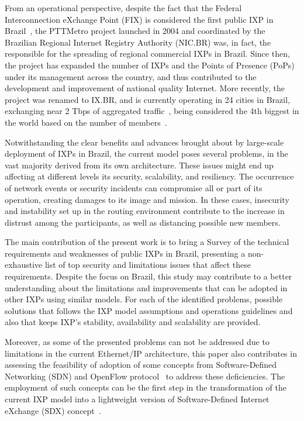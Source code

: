 \documentclass[12pt]{article}
\begin{document}
From an operational perspective, despite the fact that the Federal Interconnection eXchange Point (FIX) is considered the first public IXP in Brazil~\cite{fix2002}, the PTTMetro project launched in 2004 and coordinated by the Brazilian Regional Internet Registry Authority (NIC.BR) was, in fact, the responsible for the spreading of regional commercial IXPs in Brazil. Since then, the project has expanded the number of IXPs and the Points of Presence (PoPs) under its management across the country, and thus contributed to the development and improvement of national quality Internet. More recently, the project was renamed to IX.BR, and is currently operating in 24 cities in Brazil, exchanging near 2 Tbps of aggregated traffic~\cite{pttmetro}, being considered the 4th biggest in the world based on the number of members~\cite{putta2016region}.

Notwithstanding the clear benefits and advances brought about by large-scale deployment of IXPs in Brazil, the current model poses several problems, in the vast majority derived from its own architecture. These issues might end up affecting at different levels its  security, scalability, and resiliency. The occurrence of network events or security incidents can compromise all or part of its operation, creating damages to its image and mission. In these cases, insecurity and instability set up in the routing environment contribute to the increase in distrust among the participants, as well as distancing possible new members.

The main contribution of the present work is to bring a Survey of the technical requirements and weaknesses of public IXPs in Brazil, presenting a non-exhaustive list of top security and limitations issues that affect these requirements. Despite the focus on Brazil, this study may contribute to a better understanding about the limitations and improvements that can be adopted in other IXPs using  similar models. For each of the identified problems, possible solutions that follows the IXP model assumptions and operations guidelines and also that keeps IXP's stability, availability and scalability are provided. 

Moreover, as some of the presented problems can not be addressed due to limitations in the current Ethernet/IP architecture, this paper also contributes in assessing the feasibility of adoption of some concepts from Software-Defined Networking (SDN) and OpenFlow protocol~\cite{specification2009version} to address these deficiencies. The employment of such concepts can be the first step in the transformation of the current IXP model into a lightweight version of Software-Defined Internet eXchange (SDX) concept~\cite{gupta2015sdx}.
\end{document}

